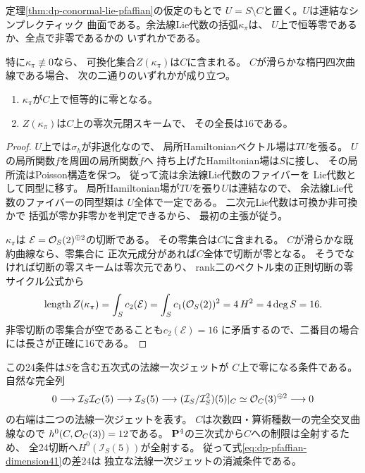 \begin{corollary}
\label{cor:dp-conormal-degeneration16}
定理\ref{thm:dp-conormal-lie-pfaffian}の仮定のもとで
$U=S\setminus C$と置く。$U$は連結なシンプレクティック
曲面である。余法線Lie代数の括弧$\kappa_\pi$は、
$U$上で恒等零であるか、全点で非零であるかの
いずれかである。

特に$\kappa_\pi\not\equiv0$なら、
可換化集合$Z(\kappa_\pi)$は$C$に含まれる。
$C$が滑らかな楕円四次曲線である場合、
次の二通りのいずれかが成り立つ。
\begin{enumerate}
\item $\kappa_\pi$が$C$上で恒等的に零となる。
\item $Z(\kappa_\pi)$は$C$上の零次元閉スキームで、
その全長は$16$である。
\end{enumerate}
\end{corollary}
\begin{proof}
$U$上では$\sigma_h$が非退化なので、
局所Hamiltonianベクトル場は$TU$を張る。
$U$の局所関数$f$を周囲の局所関数$\widetilde f$へ
持ち上げたHamiltonian場は$S$に接し、
その局所流はPoisson構造を保つ。
従って流は余法線Lie代数のファイバーを
Lie代数として同型に移す。
局所Hamiltonian場が$TU$を張り$U$は連結なので、
余法線Lie代数のファイバーの同型類は
$U$全体で一定である。
二次元Lie代数は可換か非可換かで
括弧が零か非零かを判定できるから、
最初の主張が従う。

$\kappa_\pi$は
$\mathcal E=\mathcal O_S(2)^{\oplus2}$の切断である。
その零集合は$C$に含まれる。
$C$が滑らかな既約曲線なら、零集合に
正次元成分があれば$C$全体で切断が零となる。
そうでなければ切断の零スキームは零次元であり、
rank二のベクトル束の正則切断の零サイクル公式から
\[
 \operatorname{length}Z(\kappa_\pi)
   =\int_S c_2(\mathcal E)
   =\int_S c_1(\mathcal O_S(2))^2
   =4\,H^2=4\deg S=16.
\]
非零切断の零集合が空であることも$c_2(\mathcal E)=16$
に矛盾するので、二番目の場合には長さが正確に16である。
\end{proof}

\begin{remark}[法線一次ジェットの幾何]
\label{rem:dp-normal-jet}
この24条件は$S$を含む五次式の法線一次ジェットが
$C$上で零になる条件である。自然な完全列
\[
0\longrightarrow\mathcal I_S\mathcal I_C(5)
\longrightarrow\mathcal I_S(5)
\longrightarrow
 (\mathcal I_S/\mathcal I_S^2)(5)|_C
 \simeq\mathcal O_C(3)^{\oplus2}\longrightarrow0
\]
の右端は二つの法線一次ジェットを表す。
$C$は次数四・算術種数一の完全交叉曲線なので
$h^0(C,\mathcal O_C(3))=12$である。
$\mathbf P^4$の三次式から$C$への制限は全射するため、
全24切断へ$H^0(\mathcal I_S(5))$が全射する。
従って式\eqref{eq:dp-pfaffian-dimension41}の差$24$は
独立な法線一次ジェットの消滅条件である。
\end{remark}

